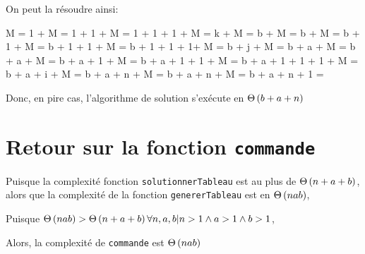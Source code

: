 \documentclass[class=article]{standalone}
\begin{document}
On peut la résoudre ainsi:
\begin{deriv}
    M
    \<= 
    1 + M
    \<= 
    1 + 1 + M
    \<= 
    1 + 1 + 1 + M
    \<= 
    k + M
    \<= 
    b + M
    \<= 
    b + M
    \<= 
    b + 1 + M
    \<= 
    b + 1 + 1 + M
    \<= 
    b + 1 + 1 + 1+ M
    \<= 
    b + j + M
    \<= 
    b + a + M
    \<= 
    b + a + M
    \<= 
    b + a + 1 + M
    \<= 
    b + a + 1  + 1 + M
    \<= 
    b + a + 1 + 1 + 1 + M
    \<= 
    b + a + i + M
    \<= 
    b + a + n + M
    \<= 
    b + a + n + M
    \<= 
    b + a + n + 1
    \<\in
    \Theta{}
    \<=
    \Theta{}
\end{deriv}


Donc, en pire cas, l'algorithme de solution s'exécute en $\Theta\left ( b + a + n \right )$

\section*{Retour sur la fonction \lstinline{commande}}

Puisque la complexité fonction \lstinline{solutionnerTableau} 
est au plus de $\Theta\left ( n + a + b \right )$, alors que la complexité 
de la fonction \lstinline{genererTableau} est en $\Theta\left ( nab \right )$,

Puisque $\Theta\left ( nab \right ) > \Theta\left ( n + a + b \right )
\forall n, a, b | n > 1 \wedge a > 1 \wedge b > 1$,

Alors, la complexité de \lstinline{commande} est $\Theta\left ( nab \right )$
\end{document}

